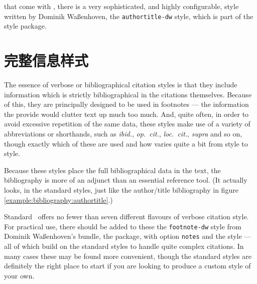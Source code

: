  that come with \biblatex,
there is a very sophisticated, and highly configurable, style written
by Dominik Waßenhoven, the \texttt{authortitle-dw} style, which is
part of the  style package.

\section{完整信息样式}

The essence of verbose or bibliographical citation styles is that they
include information which is strictly bibliographical in the citations
themselves. Because of this, they are principally designed to be used
in footnotes --- the information the provide would clutter text up
much too much. And, quite often, in order to avoid excessive
repetition of the same data, these styles make use of a variety of
abbreviations or shorthands, such as \emph{ibid.}, \emph{op.\ cit.},
\emph{loc.\ cit.}, \emph{supra} and so on, though exactly which of
these are used and how varies quite a bit from style to style.

Because these styles place the full bibliographical data in the text,
the bibliography is more of an adjunct than an essential reference
tool. (It actually looks, in the standard styles, just like the
author/title bibliography in figure
\ref{example:bibliography:authortitle}.)

Standard \biblatex\ offers no fewer than seven
different flavours of verbose citation style. For practical use, there
should be added to these the \verb|footnote-dw| style from Dominik
Waßenhoven's  bundle, the
 package, with option \verb|notes| and the
 style --- all of which build on the standard styles
to handle quite complex citations. In many cases these may be found
more convenient, though the standard styles are definitely the right
place to start if you are looking to produce a custom style of your
own.

